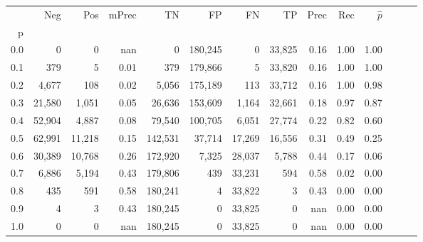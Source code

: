 \begin{tabular}{rrrrrrrrrrrrrr}
\toprule
{} &     Neg &     Pos & mPrec &       TN &       FP &      FN &      TP &  Prec &   Rec & $\hat{p}$ \\
p   &         &         &       &          &          &         &         &       &       &           \\
\midrule
0.0 &       0 &       0 &   nan &        0 &  180,245 &       0 &  33,825 &  0.16 &  1.00 &      1.00 \\
0.1 &     379 &       5 &  0.01 &      379 &  179,866 &       5 &  33,820 &  0.16 &  1.00 &      1.00 \\
0.2 &   4,677 &     108 &  0.02 &    5,056 &  175,189 &     113 &  33,712 &  0.16 &  1.00 &      0.98 \\
0.3 &  21,580 &   1,051 &  0.05 &   26,636 &  153,609 &   1,164 &  32,661 &  0.18 &  0.97 &      0.87 \\
0.4 &  52,904 &   4,887 &  0.08 &   79,540 &  100,705 &   6,051 &  27,774 &  0.22 &  0.82 &      0.60 \\
0.5 &  62,991 &  11,218 &  0.15 &  142,531 &   37,714 &  17,269 &  16,556 &  0.31 &  0.49 &      0.25 \\
0.6 &  30,389 &  10,768 &  0.26 &  172,920 &    7,325 &  28,037 &   5,788 &  0.44 &  0.17 &      0.06 \\
0.7 &   6,886 &   5,194 &  0.43 &  179,806 &      439 &  33,231 &     594 &  0.58 &  0.02 &      0.00 \\
0.8 &     435 &     591 &  0.58 &  180,241 &        4 &  33,822 &       3 &  0.43 &  0.00 &      0.00 \\
0.9 &       4 &       3 &  0.43 &  180,245 &        0 &  33,825 &       0 &   nan &  0.00 &      0.00 \\
1.0 &       0 &       0 &   nan &  180,245 &        0 &  33,825 &       0 &   nan &  0.00 &      0.00 \\
\bottomrule
\end{tabular}
